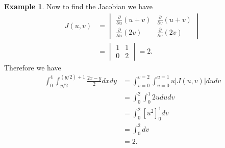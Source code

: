 \documentclass[12pt, letter]{article}
\theoremstyle{plain}
\numberwithin{theorem}{section}
\theoremstyle{definition}
\newtheorem{example}[theorem]{Example}
\begin{document}
\begin{example}
\bigskip

Now to find the Jacobian we have
\begin{align*}
J(u,v) &= \begin{vmatrix} \frac{\partial}{\partial u} (u+v) & \frac{\partial}{\partial v} (u+v)\\ \frac{\partial}{\partial u} (2v) & \frac{\partial}{\partial v} (2v) \end{vmatrix}\\
&= \begin{vmatrix} 1 & 1 \\ 0 & 2 \end{vmatrix} = 2.
\end{align*}
Therefore we have
\begin{align*}
\int_0^4 \int_{y/2}^{(y/2)+1} \frac{2x-y}{2}dxdy &= \int_{v=0}^{v=2} \int_{u=0}^{u=1} u |J(u,v)|dudv\\
&= \int_0^2 \int_0^1 2u du dv\\
&= \int_0^2 \left[u^2\right]_0^1 dv\\
&=\int_0^2 dv\\
&=2.
\end{align*}

\end{example}

\bigskip

\hrulefill

\bigskip
\end{document}
